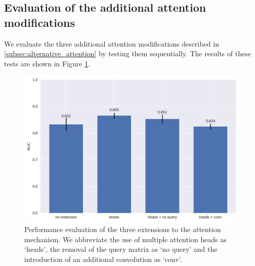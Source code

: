 \subsection{Evaluation of the additional attention modifications} \label{subsubsec:attn_hyperparams}

We evaluate the three additional attention modifications described in \ref{subsec:alternative_attention} by testing them sequentially. The results of these tests are shown in Figure \ref{fig:attn_extension_barcharts}. 

\begin{figure}
	\centering\includegraphics[width=1\textwidth]{../visualizations/ch5-results/attn_extension_barcharts.png} 
	\caption{Performance evaluation of the three extensions to the attention mechanism. We abbreviate the use of multiple attention heads as `heads', the removal of the query matrix as `no query' and the introduction of an additional convolution as `conv'. }
	\label{fig:attn_extension_barcharts}
\end{figure}



